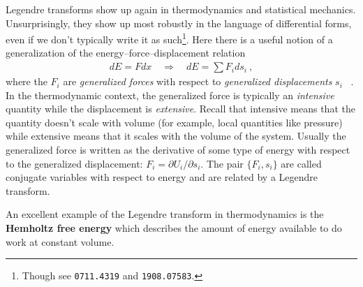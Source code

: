 Legendre transforms show up again in thermodynamics and statistical mechanics. Unsurprisingly, they show up most robustly in the language of differential forms, even if we don't typically write it as such\footnote{Though see \texttt{0711.4319} and \texttt{1908.07583}.}. Here there is a useful notion of a generalization of the energy--force--displacement relation
\begin{align}
	dE = F dx \quad\Rightarrow \quad dE = \sum F_i ds_i \ ,
\end{align}
where the $F_i$ are \emph{generalized forces} with respect to \emph{generalized displacements} $s_i$ \ . In the thermodynamic context, the generalized force is typically an \emph{intensive} quantity while the displacement is \emph{extensive}. Recall that intensive means that the quantity doesn't scale with volume (for example, local quantities like pressure) while extensive means that it scales with the volume of the system. Usually the generalized force is written as the derivative of some type of energy with respect to the generalized displacement: $F_i = \partial U_i / \partial s_i$.  The pair $\{F_i, s_i\}$ are called conjugate variables with respect to energy and are related by a Legendre transform. 

An excellent example of the Legendre transform in thermodynamics is the \textbf{Hemholtz free energy} which describes the amount of energy available to do work at constant volume. 










